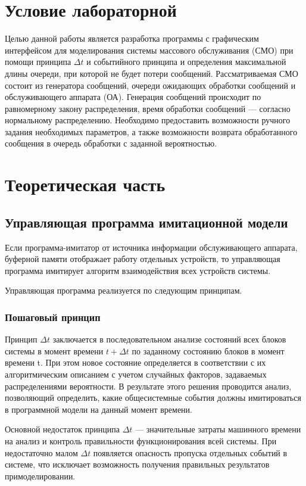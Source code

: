 \chapter{Условие лабораторной}

Целью данной работы является разработка программы с графическим интерфейсом для моделирования системы массового обслуживания (СМО) при помощи принципа $\Delta t$ и событийного принципа и определения максимальной длины очереди, при которой не будет потери сообщений. Рассматриваемая СМО состоит из генератора сообщений, очереди ожидающих обработки сообщений и обслуживающего аппарата (ОА). Генерация сообщений происходит по равномерному закону распределения, время обработки сообщений --- согласно нормальному распределению. Необходимо предоставить возможности ручного задания необходимых параметров, а также возможности возврата обработанного сообщения в очередь обработки с заданной вероятностью.


\chapter{Теоретическая часть}

\section{Управляющая программа имитационной модели}

Если программа-имитатор от источника информации обслуживающего аппарата, буферной памяти отображает работу отдельных устройств, то управляющая программа имитирует алгоритм взаимодействия всех устройств системы.

Управляющая программа реализуется по следующим принципам.

\subsection*{Пошаговый принцип}

Принцип $\Delta t$ заключается в последовательном анализе состояний всех блоков системы в момент времени $t + \Delta t$ по заданному состоянию блоков в момент времени t. При этом новое состояние определяется в соответствии с их алгоритмическим описанием с учетом случайных факторов, задаваемых распределениями вероятности. В результате этого решения проводится анализ, позволяющий определить, какие общесистемные события должны имитироваться в программной модели на данный момент времени.

Основной недостаток принципа $\Delta t$ --- значительные затраты машинного времени на анализ и контроль правильности функционирования всей системы. При недостаточно малом $\Delta t$ появляется опасность пропуска отдельных событий в системе, что исключает возможность получения правильных результатов примоделировании.

